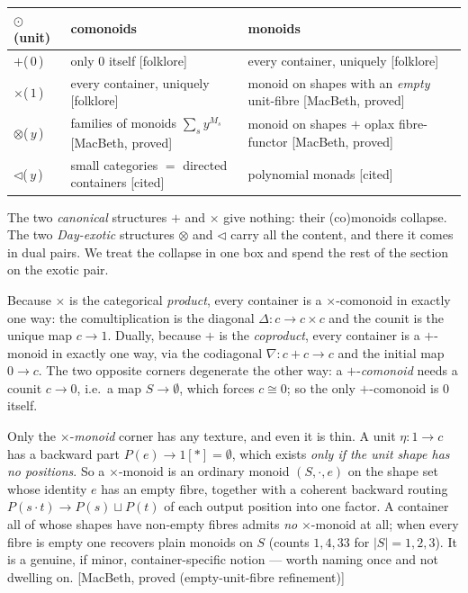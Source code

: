 \documentclass[11pt,a4paper]{book}
\theoremstyle{plain}
\theoremstyle{definition}
\theoremstyle{remark}
\newcommand{\prov}[1]{\hfill\textsf{\footnotesize[#1]}}
\begin{document}
\begin{center}\small
\renewcommand{\arraystretch}{1.35}
\begin{tabular}{@{}p{2.6cm}p{5.4cm}p{5.4cm}@{}}
\toprule
$\odot$ (unit) & \textbf{comonoids} & \textbf{monoids}\\
\midrule
$+$\quad (\,$0$\,)
  & only $0$ itself \hfill\textsf{\scriptsize[folklore]}
  & every container, uniquely \hfill\textsf{\scriptsize[folklore]}\\
$\times$\quad (\,$1$\,)
  & every container, uniquely \hfill\textsf{\scriptsize[folklore]}
  & monoid on shapes with an \emph{empty} unit-fibre \hfill\textsf{\scriptsize[MacBeth, proved]}\\
$\otimes$\quad (\,$y$\,)
  & families of monoids $\sum_s y^{M_s}$ \hfill\textsf{\scriptsize[MacBeth, proved]}
  & monoid on shapes $+$ oplax fibre-functor \hfill\textsf{\scriptsize[MacBeth, proved]}\\
$\triangleleft$\quad (\,$y$\,)
  & small categories $=$ directed containers \hfill\textsf{\scriptsize[cited]}
  & polynomial monads \hfill\textsf{\scriptsize[cited]}\\
\bottomrule
\end{tabular}
\end{center}

The two \emph{canonical} structures $+$ and $\times$ give nothing: their
(co)monoids collapse. The two \emph{Day-exotic} structures $\otimes$ and
$\triangleleft$ carry all the content, and there it comes in dual pairs. We treat
the collapse in one box and spend the rest of the section on the exotic pair.

\begin{teachbox}
Because $\times$ is the categorical \emph{product}, every container is a
$\times$-comonoid in exactly one way: the comultiplication is the diagonal
$\Delta\colon c\to c\times c$ and the counit is the unique map $c\to 1$. Dually,
because $+$ is the \emph{coproduct}, every container is a $+$-monoid in exactly one
way, via the codiagonal $\nabla\colon c+c\to c$ and the initial map $0\to c$. The
two opposite corners degenerate the other way: a $+$-\emph{comonoid} needs a
counit $c\to 0$, i.e.\ a map $S\to\emptyset$, which forces $c\cong 0$; so the only
$+$-comonoid is $0$ itself.

Only the $\times$-\emph{monoid} corner has any texture, and even it is thin. A
unit $\eta\colon 1\to c$ has a backward part $P(e)\to 1[\ast]=\emptyset$, which
exists \emph{only if the unit shape has no positions}. So a $\times$-monoid is an
ordinary monoid $(S,\cdot,e)$ on the shape set whose identity $e$ has an empty
fibre, together with a coherent backward routing $P(s\cdot t)\to P(s)\sqcup P(t)$
of each output position into one factor. A container all of whose shapes have
non-empty fibres admits \emph{no} $\times$-monoid at all; when every fibre is
empty one recovers plain monoids on $S$ (counts $1,4,33$ for $|S|=1,2,3$). It is a
genuine, if minor, container-specific notion --- worth naming once and not
dwelling on.
\prov{MacBeth, proved (empty-unit-fibre refinement)}
\end{teachbox}
\end{document}
